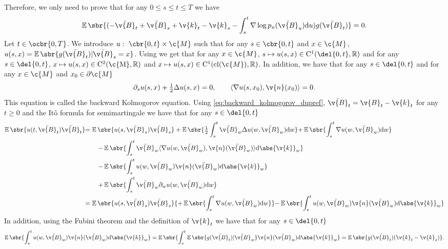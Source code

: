Therefore, we only need to prove that for any \(0 \leq s \leq t \leq T\) we have \begin{equation} \label{eq:second_equality} {\E\sbr{(-\bar{\v{B}}_{t} + \bar{\v{B}}_{s} + \v{k}_t - \v{k}_{s} - \int_{s}^{t} \nabla \log p_u(\bar{\v{B}}_u) \mathrm{d} u) g(\bar{\v{B}}_{t})}=0 .
	}
\end{equation}
Let \(t \in \ocbr{0,T}\).
We introduce \(u: \ \cbr{0,t} \times \c{M}\) such that for any \(s \in \cbr{0,t}\) and \(x \in \c{M}\), \(u(s, x) = \E\sbr{g(\bar{\v{B}}_t) \vert \bar{\v{B}}_s=x}\).
Using \textcite[Theorem 2.8]{burdzy2004heat} we get that for any \(x \in \c{M}\), \(s \mapsto u(s,x) \in \mathrm{C}^1(\del{0,t}, \R)\) and for any \(s \in \del{0,t}\), \(x \mapsto u(s,x) \in \mathrm{C}^2(\mathrm{\c{M}}, \R)\) and \(x \mapsto u(s,x) \in \mathrm{C}^1(\mathrm{cl}(\c{M}), \R)\).
In addition, we have that for any \(s \in \del{0,t}\) and for any \(x \in \c{M}\) and \(x_0 \in \partial \c{M}\) \begin{equation} \label{eq:backward_kolmogorov_dupref} {\partial_s u(s,x) + \tfrac{1}{2} \Delta u(s,x) = 0 , \qquad \langle \nabla u(s, x_0), \v{n}(x_0) \rangle = 0 .
	}
\end{equation}
This equation is called the backward Kolmogorov equation.
Using \eqref{eq:backward_kolmogorov_dupref}, \(\bar{\v{B}}_t = \v{B}_t - \v{k}_t\) for any \(t \geq 0\) and the It\^o formula for semimartingale \parencite[Chapter IV, Theorem 3.3]{revuz2013continuous} we have that for any \(s \in \del{0,t}\) \begin{align} \E\sbr{u(t, \bar{\v{B}}_t)\bar{\v{B}}_t} & {= \E\sbr{u(s, \bar{\v{B}}_s)\bar{\v{B}}_s} + \E\sbr{\tfrac{1}{2} \int_s^t \bar{\v{B}}_w \Delta u(w, \bar{\v{B}}_w) \mathrm{d} w}} {+\E\sbr{\int_s^t \nabla u(w, \bar{\v{B}}_w) \mathrm{d} w }} \\ & \qquad {- \E\sbr{\int_s^t \bar{\v{B}}_w \langle \nabla u(w, \bar{\v{B}}_w), \v{n}(\bar{\v{B}}_w) \rangle \mathrm{d} \abs{\v{k}}_w}} \\ & \qquad {- \E\sbr{\int_s^t u(w,\bar{\v{B}}_w) \v{n}(\bar{\v{B}}_w) \mathrm{d} \abs{\v{k}}_w}} \\ & \qquad {+ \E\sbr{\int_s^t \bar{\v{B}}_w \partial_w u(w, \bar{\v{B}}_w) \mathrm{d} w} } \\ & {= \E\sbr{u(s, \bar{\v{B}}_s)\bar{\v{B}}_s} {+\E\sbr{\int_s^t \nabla u(w, \bar{\v{B}}_w) \mathrm{d} w }}} {- \E\sbr{\int_s^t u(w,\bar{\v{B}}_w) \v{n}(\bar{\v{B}}_w) \mathrm{d} \abs{\v{k}}_w}} \label{eq:intermediate} \end{align} In addition, using the Fubini theorem and the definition of \(\v{k}_t\) we have that for any \(s \in \del{0,t}\) \begin{equation} {\E\sbr{\int_s^t u(w,\bar{\v{B}}_w) \v{n}(\bar{\v{B}}_w) \mathrm{d} \abs{\v{k}}_w} = \E\sbr{\int_s^t \E\sbr{g(\bar{\v{B}}_t) \vert \bar{\v{B}}_w} \v{n}(\bar{\v{B}}_w) \mathrm{d} \abs{\v{k}}_w} = \E\sbr{g(\bar{\v{B}}_t)(\v{k}_t - \v{k}_s)} .
	} \label{eq:boundary_uno}
\end{equation}

